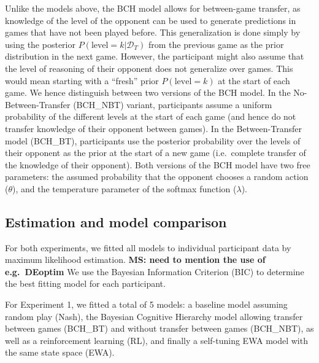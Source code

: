 \documentclass[
  english,
  man,floatsintext]{apa6}
\begin{document}
Unlike the models above, the BCH model allows for between-game transfer, as knowledge of the level of the opponent can be used to generate predictions in games that have not been played before. This generalization is done simply by using the posterior \(P(\text{level} = k|\mathcal{D}_T)\) from the previous game as the prior distribution in the next game. However, the participant might also assume that the level of reasoning of their opponent does not generalize over games. This would mean starting with a ``fresh'' prior \(P(\text{level} = k)\) at the start of each game. We hence distinguish between two versions of the BCH model. In the No-Between-Transfer (BCH\_NBT) variant, participants assume a uniform probability of the different levels at the start of each game (and hence do not transfer knowledge of their opponent between games). In the Between-Transfer model (BCH\_BT), participants use the posterior probability over the levels of their opponent as the prior at the start of a new game (i.e.~complete transfer of the knowledge of their opponent). Both versions of the BCH model have two free parameters: the assumed probability that the opponent chooses a random action (\(\theta\)), and the temperature parameter of the softmax function (\(\lambda\)).

\hypertarget{estimation-and-model-comparison}{%
\subsection{Estimation and model comparison}\label{estimation-and-model-comparison}}

For both experiments, we fitted all models to individual participant data by maximum likelihood estimation. \textbf{MS: need to mention the use of e.g.~DEoptim} We use the Bayesian Information Criterion (BIC) to determine the best fitting model for each participant.

For Experiment 1, we fitted a total of 5 models: a baseline model assuming random play (Nash), the Bayesian Cognitive Hierarchy model allowing transfer between games (BCH\_BT) and without transfer between games (BCH\_NBT), as well as a reinforcement learning (RL), and finally a self-tuning EWA model with the same state space (EWA).
\end{document}

